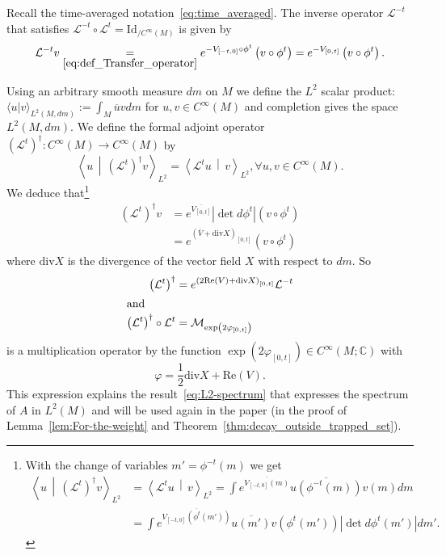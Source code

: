 \documentclass[AHL,Unicode,longabstracts,published]{cedram}
\newcommand{\clL}{\mathcal{L}}
\newcommand{\clM}{\mathcal{M}}
\newcommand{\Ree}{\mathrm{Re}}
\newcommand{\divv}{\mathrm{div}}
\newcommand{\Id}{\mathrm{Id}}
\newcommand{\bbC}{\mathbb{C}}
\let\oldforall\forall
\renewcommand*{\forall}{\mathrel{\oldforall}}
\newcommand{\Ree}{\mathrm{Re}}
\begin{document}
Recall the time-averaged notation~\eqref{eq:time_averaged}. The inverse operator $\clL^{-t}$ that satisfies $\clL^{-t}\circ\clL^{t}=\Id _{/C^{\infty}(M)}$ is given by
\[
\clL^{-t}v\underset{\eqref{eq:def_Transfer_operator}}{=}e^{-V_{\left[-t,0\right]}\circ\phi^{t}}\left(v\circ\phi^{t}\right)=e^{-V_{\left[0,t\right]}}\left(v\circ\phi^{t}\right).
\]

Using an arbitrary smooth measure $dm$ on $M$ we define the $L^{2}$ scalar product: $\langle u|v\rangle_{L^{2}(M,dm)}:=\int_{M}\overline{u}vdm$ for $u,v\in C^{\infty}(M)$ and completion gives the space $L^{2}(M,dm)$. We define the formal adjoint operator $(\clL^{t})^{\dagger}:C^{\infty}(M)\rightarrow C^{\infty}(M)$ by
\[
\left\langle u\,\middle|\,\left(\clL^{t}\right)^{\dagger}v\right\rangle_{L^{2}}=\left\langle\clL^{t}u\,\middle|\,v\right\rangle_{L^{2}},\forall u,v\in C^{\infty}\left(M\right).
\]
We deduce that\footnote{With the change of variables $m'=\phi^{-t}(m)$ we get
\begin{align*}
\left\langle u\,\middle|\,\left(\clL^{t}\right)^{\dagger}v\right\rangle_{L^{2}} & =\left\langle\clL^{t}u\,\middle|\,v\right\rangle_{L^{2}}=\int e^{\overline{V_{\left[-t,0\right]}\left(m\right)}}\overline{u\left(\phi^{-t}\left(m\right)\right)}v\left(m\right)dm\\
& =\int e^{\overline{V_{\left[-t,0\right]}\left(\phi^{t}\left(m'\right)\right)}}\overline{u\left(m'\right)}v\left(\phi^{t}\left(m'\right)\right)\left|\det d\phi^{t}\left(m'\right)\right|dm'.
\end{align*}
}
\begin{align}
\left(\clL^{t}\right)^{\dagger}v & =e^{\overline{V_{\left[0,t\right]}}}\left|\det d\phi^{t}\right|\left(v\circ\phi^{t}\right)\label{eq:L2-adjoint_Lt}
\\
& =e^{\left(\overline{V}+\divv X\right)_{\left[0,t\right]}}\left(v\circ\phi^{t}\right)
\end{align}
where $\divv X$ is the divergence of the vector field $X$ with respect to $dm$. So
\begin{align}
\left(\clL^{t}\right)^{\dagger}&=e^{\left(2\Ree\left(V\right)+\divv X\right)_{\left[0,t\right]}}\clL^{-t}
\\
\intertext{and}
\left(\clL^{t}\right)^{\dagger}\circ\clL^{t}&=\clM_{\exp\left(2\varphi_{\left[0,t\right]}\right)}\label{eq:L*t*Lt}
\end{align}
is a multiplication operator by the function $\exp\left(2\varphi_{\left[0,t\right]}\right)\in C^{\infty}\left(M;\bbC\right)$ with
\begin{equation}\label{eq:def_At}
\varphi=\frac{1}{2}\divv X+\Ree\left(V\right).
\end{equation}
This expression explains the result~\eqref{eq:L2-spectrum} that expresses the spectrum of $A$ in $L^{2}(M)$ and will be used again in the paper (in the proof of Lemma~\ref{lem:For-the-weight} and Theorem~\ref{thm:decay_outside_trapped_set}).
\end{document}
